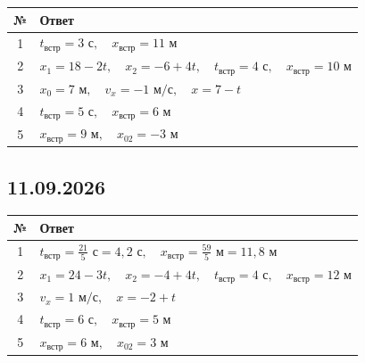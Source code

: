 \documentclass[a4paper,12pt]{article}
\begin{document}
\begin{center}
\renewcommand{\arraystretch}{1.45}
\begin{tabularx}{\linewidth}{@{}cX@{}}
\toprule
\textbf{№} & \textbf{Ответ} \\
\midrule
1 &
\(
t_{\text{встр}}=3\text{ с},
\quad
x_{\text{встр}}=11\text{ м}
\)
\\

2 &
\(
x_1=18-2t,
\quad
x_2=-6+4t,
\quad
t_{\text{встр}}=4\text{ с},
\quad
x_{\text{встр}}=10\text{ м}
\)
\\

3 &
\(
x_0=7\text{ м},
\quad
v_x=-1\text{ м/с},
\quad
x=7-t
\)
\\

4 &
\(
t_{\text{встр}}=5\text{ с},
\quad
x_{\text{встр}}=6\text{ м}
\)
\\

5 &
\(
x_{\text{встр}}=9\text{ м},
\quad
x_{02}=-3\text{ м}
\)
\\
\bottomrule
\end{tabularx}
\end{center}

\vspace{8mm}

\subsection*{\color{darkaccent}11.09.2026}

\begin{center}
\renewcommand{\arraystretch}{1.45}
\begin{tabularx}{\linewidth}{@{}cX@{}}
\toprule
\textbf{№} & \textbf{Ответ} \\
\midrule
1 &
\(
t_{\text{встр}}=\frac{21}{5}\text{ с}=4{,}2\text{ с},
\quad
x_{\text{встр}}=\frac{59}{5}\text{ м}=11{,}8\text{ м}
\)
\\

2 &
\(
x_1=24-3t,
\quad
x_2=-4+4t,
\quad
t_{\text{встр}}=4\text{ с},
\quad
x_{\text{встр}}=12\text{ м}
\)
\\

3 &
\(
v_x=1\text{ м/с},
\quad
x=-2+t
\)
\\

4 &
\(
t_{\text{встр}}=6\text{ с},
\quad
x_{\text{встр}}=5\text{ м}
\)
\\

5 &
\(
x_{\text{встр}}=6\text{ м},
\quad
x_{02}=3\text{ м}
\)
\\
\bottomrule
\end{tabularx}
\end{center}
\end{document}
